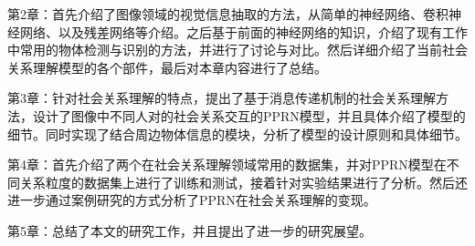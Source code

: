 第2章：首先介绍了图像领域的视觉信息抽取的方法，从简单的神经网络、卷积神经网络、以及残差网络等介绍。之后基于前面的神经网络的知识，介绍了现有工作中常用的物体检测与识别的方法，并进行了讨论与对比。然后详细介绍了当前社会关系理解模型的各个部件，最后对本章内容进行了总结。

第3章：针对社会关系理解的特点，提出了基于消息传递机制的社会关系理解方法，设计了图像中不同人对的社会关系交互的PPRN模型，并且具体介绍了模型的细节。同时实现了结合周边物体信息的模块，分析了模型的设计原则和具体细节。

第4章：首先介绍了两个在社会关系理解领域常用的数据集，并对PPRN模型在不同关系粒度的数据集上进行了训练和测试，接着针对实验结果进行了分析。然后还进一步通过案例研究的方式分析了PPRN在社会关系理解的变现。

第5章：总结了本文的研究工作，并且提出了进一步的研究展望。



